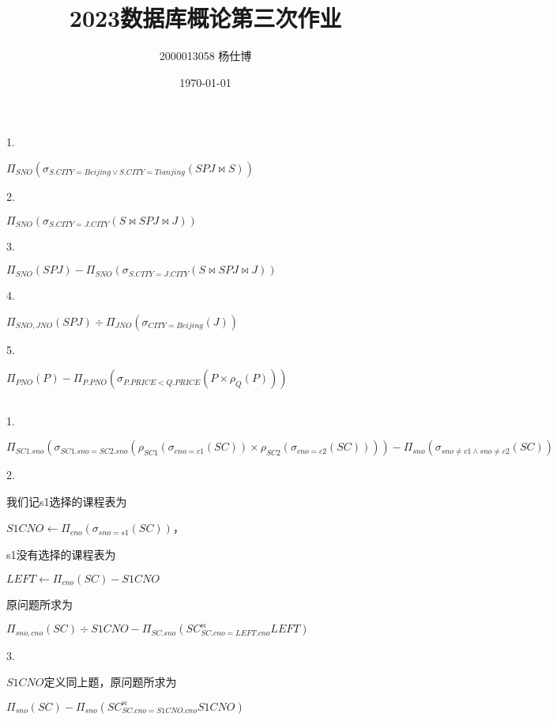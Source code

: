\documentclass[UTF8]{ctexart}
\title{\vspace{-4cm}2023数据库概论第三次作业}
\author{2000013058 杨仕博}
\date{\today}
\begin{document}
\maketitle

\subsection{}

1.

$\Pi_{SNO}(\sigma_{S.CITY=Beijing\lor S.CITY = Tianjing}(SPJ\bowtie S))$

2.

$\Pi_{SNO}(\sigma_{S.CITY=J.CITY}(S\bowtie SPJ\bowtie J))$

3.

$\Pi_{SNO}(SPJ) - \Pi_{SNO}(\sigma_{S.CITY=J.CITY}(S\bowtie SPJ\bowtie J))$

4.

$\Pi_{SNO, JNO}(SPJ) \div \Pi_{JNO}(\sigma_{CITY = Beijing}(J))$

5.

$\Pi_{PNO}(P) - \Pi_{P.PNO}(\sigma_{P.PRICE < Q.PRICE}(P\times \rho_{Q}(P)))$

\subsection{}

1.

$\Pi_{SC1.sno}(\sigma_{SC1.sno = SC2.sno}(\rho_{SC1}(\sigma_{cno=c1}(SC))\times \rho_{SC2}(\sigma_{cno = c2}(SC)))) - 
\Pi_{sno}(\sigma_{sno\neq c1\land sno\neq c2}(SC))$

2.

我们记s1选择的课程表为

$S1CNO \leftarrow \Pi_{cno}(\sigma_{sno = s1}(SC))$，

s1没有选择的课程表为

$LEFT \leftarrow \Pi_{cno}(SC) - S1CNO$

原问题所求为

$\Pi_{sno, cno}(SC)\div S1CNO - \Pi_{SC.sno}(SC^{\bowtie}_{SC.cno = LEFT.cno} LEFT)$

3.

$S1CNO$定义同上题，原问题所求为

$\Pi_{sno}(SC) - \Pi_{sno}(SC^{\bowtie}_{SC.cno = S1CNO.cno} S1CNO)$

\subsection{}
\end{document}
